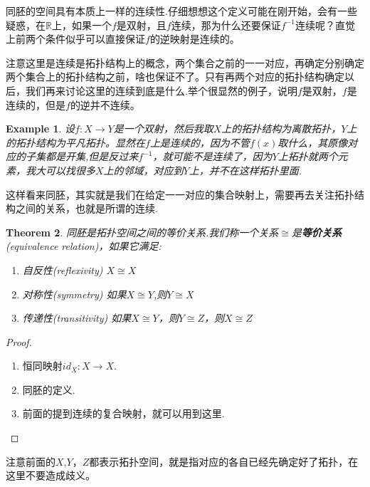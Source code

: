 \documentclass{article}
\newtheorem{theorem}{Theorem}[section]
\newtheorem{example}[theorem]{Example}
\newcommand*{\xfunc}[4]{{#2}\colon{#3}{#1}{#4}}
\newcommand*{\func}[3]{\xfunc{\to}{#1}{#2}{#3}}
\begin{document}
同胚的空间具有本质上一样的连续性.仔细想想这个定义可能在刚开始，会有一些疑惑，在$\mathbb{R}$上，如果一个$f$是双射，且$f$连续，那为什么还要保证$f^{-1}$连续呢？直觉上前两个条件似乎可以直接保证$f$的逆映射是连续的。

注意这里是连续是拓扑结构上的概念，两个集合之前的一一对应，再确定分别确定两个集合上的拓扑结构之前，啥也保证不了。只有再两个对应的拓扑结构确定以后，我们再来讨论这里的连续到底是什么.举个很显然的例子，说明$f$是双射，$f$是连续的，但是$f$的逆并不连续。

\begin{example}
设$\func{f}{X}{Y}$是一个双射，然后我取$X$上的拓扑结构为离散拓扑，$Y$上的拓扑结构为平凡拓扑。显然在$f$上是连续的，因为不管$f(x)$取什么，其原像对应的子集都是开集,但是反过来$f^{-1}$，就可能不是连续了，因为$Y$上拓扑就两个元素，我大可以找很多$X$上的邻域，对应到$Y$上，并不在这样拓扑里面.
\end{example}

这样看来同胚，其实就是我们在给定一一对应的集合映射上，需要再去关注拓扑结构之间的关系，也就是所谓的连续.

\begin{theorem}
同胚是拓扑空间之间的等价关系.我们称一个关系$\cong$是\textbf{等价关系}(equivalence relation)，如果它满足:
\begin{enumerate}
	\item 自反性(reflexivity) $X \cong X$
	\item 对称性(symmetry) 如果$X \cong Y$,则$Y \cong X$ 
	\item 传递性(transitivity) 如果$X \cong Y$，则$Y \cong Z$，则$X \cong Z$
\end{enumerate}
\end{theorem}

\begin{proof}
\begin{enumerate}
	\item 恒同映射$\func{id_X}{X}{X}$.
	\item 同胚的定义.
	\item 前面的提到连续的复合映射，就可以用到这里.
\end{enumerate}
\end{proof}

注意前面的$X$,$Y$，$Z$都表示拓扑空间，就是指对应的各自已经先确定好了拓扑，在这里不要造成歧义。
\end{document}
